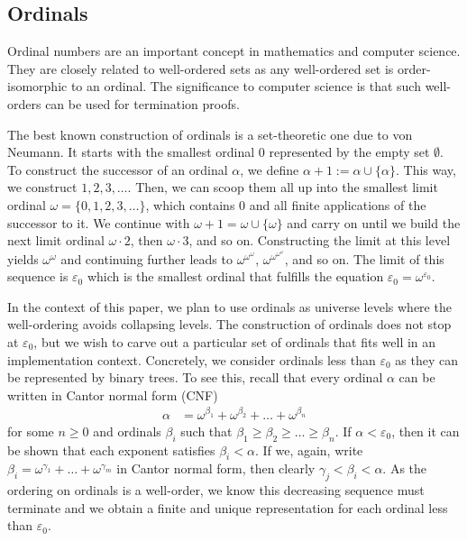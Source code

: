\documentclass[manuscript,screen,review,anonymous]{acmart}
\begin{document}
\subsection{Ordinals}
\label{sec:ordinals}

Ordinal numbers are an important concept in mathematics and computer
science. They are closely related to well-ordered sets as any
well-ordered set is order-isomorphic to an ordinal. The significance
to computer science is that such well-orders can be used for
termination proofs.

The best known construction of ordinals is a set-theoretic one due to
von Neumann. It starts with the smallest ordinal $0$ represented by
the empty set $\emptyset$. To construct the successor of an ordinal
$\alpha$, we define $\alpha+1  := \alpha \cup \{ \alpha \}$. This way,
we construct $1, 2, 3, \dots$. Then, we can scoop them all up into the
smallest limit ordinal $\omega = \{ 0, 1, 2, 3, \dots \}$, which
contains $0$ and all finite applications of the successor to it. We
continue with $\omega + 1 = \omega \cup \{ \omega \}$ and carry on
until we build the next limit ordinal $\omega \cdot 2$, then $\omega
\cdot 3$, and so on. Constructing the limit at this level yields
$\omega^\omega$ and continuing further leads to
$\omega^{\omega^\omega}$, $\omega^{\omega^{\omega^\omega}}$, and so
on. The limit of this sequence is $\varepsilon_0$ which is the
smallest ordinal that fulfills the equation
$\varepsilon_0 = \omega^{\varepsilon_0}$.

In the context of this paper, we plan to use
ordinals as universe levels where the well-ordering avoids collapsing
levels. The construction of ordinals does not stop at $\varepsilon_0$,
but we wish to carve out a particular set of ordinals that fits
well in an implementation context. Concretely, we consider ordinals
less than $\varepsilon_0$ as they can be represented by binary trees.
To see this, recall that every ordinal $\alpha$ can be written in
Cantor normal form (CNF)
\begin{align*}
  \alpha &= \omega^{\beta_1} + \omega^{\beta_2}  + \dots + \omega^{\beta_n}
\end{align*}
for some $n\ge0$ and ordinals $\beta_i$ such that
$\beta_1\ge\beta_2\ge \dots \ge \beta_n$. If $\alpha < \varepsilon_0$,
then it can be shown that each exponent satisfies $\beta_i < \alpha$.
If we, again, write $\beta_i = \omega^{\gamma_1} + \dots +
\omega^{\gamma_m}$ in Cantor normal form, then clearly $\gamma_j <
\beta_i < \alpha$. As the ordering on ordinals is a well-order, we
know this decreasing sequence must terminate and we obtain a finite 
and unique representation for each ordinal less than $\varepsilon_0$.
\end{document}

